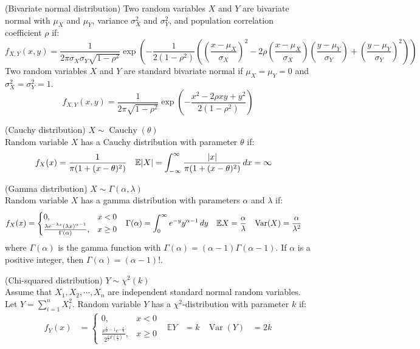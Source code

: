 \documentclass{huhtakm-template-book}
\newcommand{\expect}{\mathbb{E}}
\DeclareMathOperator{\Cauchy}{Cauchy}
\DeclareMathOperator{\Var}{Var}
\begin{document}
\begin{seg}(Bivariate normal distribution)
	Two random variables $X$ and $Y$ are bivariate normal with $\mu_{X}$ and $\mu_{Y}$, variance $\sigma_{X}^{2}$ and $\sigma_{Y}^{2}$, and population correlation coefficient $\rho$ if:
	\begin{equation*}
		f_{X,Y}(x,y)=\frac{1}{2\pi\sigma_{X}\sigma_{Y}\sqrt{1-\rho^{2}}}\exp\left(-\frac{1}{2(1-\rho^{2})}\left(\left(\frac{x-\mu_{X}}{\sigma_{X}}\right)^{2}-2\rho\left(\frac{x-\mu_{X}}{\sigma_{X}}\right)\left(\frac{y-\mu_{Y}}{\sigma_{Y}}\right)+\left(\frac{y-\mu_{Y}}{\sigma_{Y}}\right)^{2}\right)\right)
	\end{equation*}
	Two random variables $X$ and $Y$ are standard bivariate normal if $\mu_{X}=\mu_{Y}=0$ and $\sigma_{X}^{2}=\sigma_{Y}^{2}=1$.
	\begin{equation*}
		f_{X,Y}(x,y)=\frac{1}{2\pi\sqrt{1-\rho^{2}}}\exp\left(-\frac{x^{2}-2\rho xy+y^{2}}{2(1-\rho^{2})}\right)
	\end{equation*}
\end{seg}
\begin{seg}(Cauchy distribution) $X\sim\Cauchy(\theta)$\\
	Random variable $X$ has a Cauchy distribution with parameter $\theta$ if:
	\begin{align*}
		f_{X}(x)&=\frac{1}{\pi(1+(x-\theta)^{2})} & \expect|X|&=\intinfty\frac{|x|}{\pi(1+(x-\theta)^{2})}\,dx=\infty
	\end{align*}
\end{seg}
\begin{seg}(Gamma distribution) $X\sim\Gamma(\alpha,\lambda)$\\
	Random variable $X$ has a gamma distribution with parameters $\alpha$ and $\lambda$ if:
	\begin{align*}
		f_{X}(x)&=\begin{cases}
			0, &x<0\\
			\frac{\lambda e^{-\lambda x}(\lambda x)^{\alpha-1}}{\Gamma(\alpha)}, &x\geq 0
		\end{cases} & \Gamma(\alpha)&=\intlu{0}{\infty}e^{-y}y^{\alpha-1}\,dy & \expect{X}&=\frac{\alpha}{\lambda} & \Var(X)&=\frac{\alpha}{\lambda^{2}}
	\end{align*}
	where $\Gamma(\alpha)$ is the gamma function with $\Gamma(\alpha)=(\alpha-1)\Gamma(\alpha-1)$. If $\alpha$ is a positive integer, then $\Gamma(\alpha)=(\alpha-1)!$.
\end{seg}
\begin{seg}(Chi-squared distribution) $Y\sim\chi^{2}(k)$\\
	Assume that $X_{1},X_{2},\cdots,X_{n}$ are independent standard normal random variables. Let $Y=\sum_{i=1}^{n}X_{i}^{2}$. Random variable $Y$ has a $\chi^{2}$-distribution with parameter $k$ if:
	\begin{align*}
		f_{Y}(x)&=\begin{cases}
			0, &x<0\\
			\frac{x^{\frac{k}{2}-1}e^{-\frac{x}{2}}}{2^{\frac{k}{2}\Gamma(\frac{k}{2})}}, &x\geq 0
		\end{cases} & \expect{Y}&=k & \Var(Y)&=2k
	\end{align*}
\end{seg}
\end{document}
